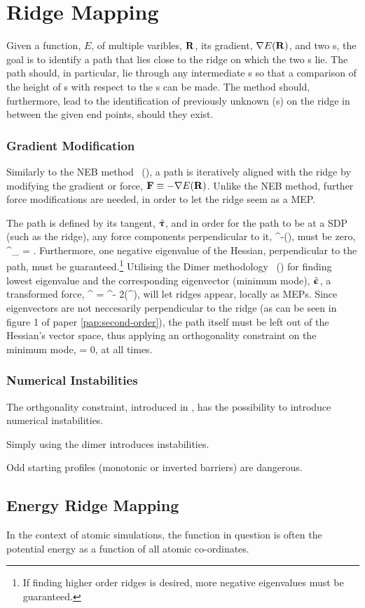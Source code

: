 \section{Ridge Mapping}
\label{sec:ridge-mapping}

Given a function, $E$, of multiple varibles, ${\mathrm{\mathbf{\bm{R}}}}$, its gradient, $\nabla E({\mathrm{\mathbf{\bm{R}}}})$, and two s, the goal is to identify a path that lies close to the ridge on which the two s lie.
The path should, in particular, lie through any intermediate s so that a comparison of the height of s with respect to the s can be made.
The method should, furthermore, lead to the identification of previously unknown (s) on the ridge in between the given end points, should they exist.

\subsubsection{Gradient Modification}
Similarly to the NEB method~\cite{neb-original-1998} (), a path is iteratively aligned with the ridge by modifying the gradient or force, ${\mathrm{\mathbf{\bm{F}}}} \equiv -\nabla E({\mathrm{\mathbf{\bm{R}}}})$.
Unlike the NEB method, further force modifications are needed, in order to let the ridge seem as a MEP.

The path is defined by its tangent, $\hat{{\mathrm{\mathbf{\bm{\uptau}}}}}$, and in order for the path to be at a SDP (such as the ridge), any force components perpendicular to it,
\vF^\perp \equiv \vF -(\F \cdot \uvt)\uvt,
\eeq
must be zero,
\vF^\perp_ = .
\eeq
Furthermore, one negative eigenvalue of the Hessian, perpendicular to the path, must be guaranteed.\footnote{If finding higher order ridges is desired, more negative eigenvalues must be guaranteed.}
Utilising the Dimer methodology~\cite{dimer-original-1999, dimer-olsen-2004} () for finding lowest eigenvalue and the corresponding eigenvector (minimum mode), $\hat{{\mathrm{\mathbf{\bm{\upepsilon}}}}}$, a transformed force,
\vF^ = \vF^\perp - 2(\vF^\perp \cdot \uvn)\uvn,
\eeq
will let ridges appear, locally as MEPs.
Since eigenvectors are not neccesarily perpendicular to the ridge (as can be seen in figure 1 of paper \ref{pap:second-order}), the path itself must be left out of the Hessian's vector space, thus applying an orthogonality constraint on the minimum mode,
\uvt \cdot \uvn = 0,
\eeq
at all times.

\subsubsection{Numerical Instabilities}
\bit
\item The orthgonality constraint, introduced in , has the possibility to introduce numerical instabilities.
\item Simply using the dimer introduces instabilities.
\item Odd starting profiles (monotonic or inverted barriers) are dangerous.
\eit

\placeholder

\subsection{Energy Ridge Mapping}
\label{sec:energy-ridge-mapping}

In the context of atomic simulations, the function in question is often the potential energy as a function of all atomic co-ordinates.

\incomplete
